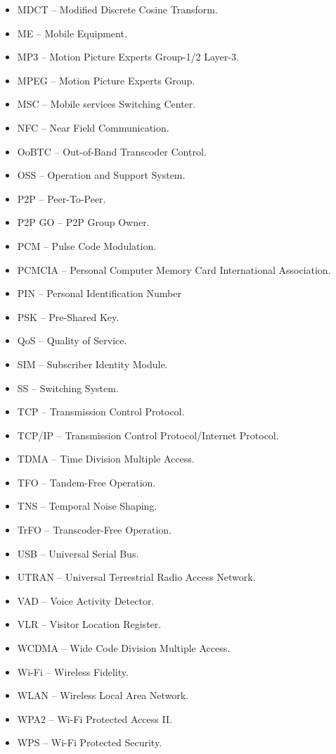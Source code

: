 \documentclass[12pt,svgnames,smaller]{article} %
\begin{document}
\begin{itemize}
		\item MDCT – Modified Discrete Cosine Transform.
		\item ME – Mobile Equipment.
		\item MP3 – Motion Picture Experts Group-1/2 Layer-3.
		\item MPEG – Motion Picture Experts Group. 
		\item MSC – Mobile services Switching Center.
		\item NFC – Near Field Communication.
		\item OoBTC – Out-of-Band Transcoder Control.
		\item OSS – Operation and Support System.
		\item P2P – Peer-To-Peer.
		\item P2P GO – P2P Group Owner.
		\item PCM – Pulse Code Modulation.
		\item PCMCIA – Personal Computer Memory Card International Association.
		\item PIN – Personal Identification Number
		\item PSK – Pre-Shared Key.
		\item QoS – Quality of Service.
		\item SIM – Subscriber Identity Module.
		\item SS – Switching System.
		\item TCP – Transmission Control Protocol.
		\item TCP/IP – Transmission Control Protocol/Internet Protocol. 
		\item TDMA – Time Division Multiple Access.
		\item TFO – Tandem-Free Operation.
		\item TNS – Temporal Noise Shaping. 
		\item TrFO – Transcoder-Free Operation. 
		\item USB – Universal Serial Bus.
		\item UTRAN – Universal Terrestrial Radio Access Network.
		\item VAD – Voice Activity Detector.
		\item VLR – Visitor Location Register.
		\item WCDMA – Wide Code Division Multiple Access.
		\item Wi-Fi – Wireless Fidelity.
		\item WLAN – Wireless Local Area Network.
		\item WPA2 – Wi-Fi Protected Access II.
		\item WPS – Wi-Fi Protected Security. 
	\end{itemize}
	
\end{document}
